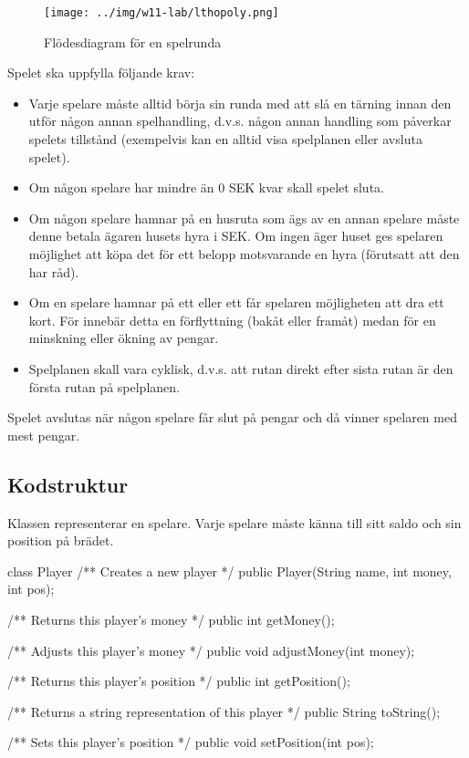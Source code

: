 \begin{figure}[H]
\centering
\texttt{[image: ../img/w11-lab/lthopoly.png]}
\caption {Flödesdiagram för en spelrunda}
\label{fig:scalajava:lthopoly-team:flowchart}
\end{figure}

Spelet ska uppfylla följande krav:
\begin{itemize}
\item Varje spelare måste alltid börja sin runda med att slå en tärning innan den utför någon annan spelhandling, d.v.s. någon annan handling som påverkar spelets tillstånd (exempelvis kan en alltid visa spelplanen eller avsluta spelet).
\item Om någon spelare har mindre än 0 SEK kvar skall spelet sluta.
\item Om någon spelare hamnar på en husruta som ägs av en annan spelare måste denne betala ägaren husets hyra i SEK. Om ingen äger huset ges spelaren möjlighet att köpa det för ett belopp motsvarande en hyra (förutsatt att den har råd).
\item Om en spelare hamnar på ett  eller ett  får spelaren möjligheten att dra ett kort. För  innebär detta en förflyttning (bakåt eller framåt) medan för  en minskning eller ökning av pengar.
\item Spelplanen skall vara cyklisk, d.v.s. att rutan direkt efter sista rutan är den första rutan på spelplanen.
\end{itemize}

Spelet avslutas när någon spelare får slut på pengar och då vinner spelaren med mest pengar.

\subsection{Kodstruktur}

Klassen  representerar en spelare. Varje spelare måste känna till sitt saldo och sin position på brädet.

\begin{JavaSpec}{class Player}
	/** Creates a new player */
	public Player(String name, int money, int pos);

	/** Returns this player's money */
	public int getMoney();

	/** Adjusts this player's money */
	public void adjustMoney(int money);

	/** Returns this player's position */
	public int getPosition();

	/** Returns a string representation of this player */
	public String toString();

	/** Sets this player's position */
	public void setPosition(int pos);

\end{JavaSpec}

